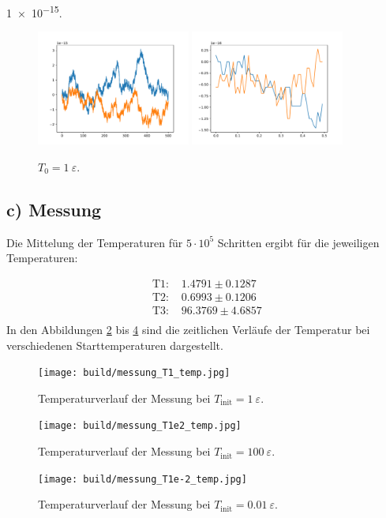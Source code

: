 \num{1e-15}.
\begin{figure}
    \centering
    \includegraphics[width=0.45\textwidth]{A1/build/aequi1_V.pdf}
    \includegraphics[width=0.45\textwidth]{A1/build/aequi1_VV.pdf}
    \caption{$T_\text{0} = 1\:\varepsilon$.}
    \label{fig:v1}
\end{figure} 

\FloatBarrier
\subsection*{c) Messung}
Die Mittelung der Temperaturen für $5\cdot 10^5$ Schritten ergibt für die jeweiligen Temperaturen:

\begin{align}
    \text{ T1:  } &  1.4791  \pm  0.1287 \\
    \text{ T2:  } &  0.6993  \pm  0.1206 \\
    \text{ T3:  } & 96.3769  \pm  4.6857 \\
\end{align}
In den Abbildungen \ref{fig:messung_T=1_temp} bis \ref{fig:messung_T=1e-2_temp}
sind die zeitlichen Verläufe der Temperatur
bei verschiedenen Starttemperaturen dargestellt.

\begin{figure}
    \centering
    \texttt{[image: build/messung\_T1\_temp.jpg]}
    \caption{Temperaturverlauf der Messung bei $T_\text{init} = 1\:\varepsilon$.}
    \label{fig:messung_T=1_temp}
\end{figure}
\begin{figure}
    \centering
    \texttt{[image: build/messung\_T1e2\_temp.jpg]}
    \caption{Temperaturverlauf der Messung bei $T_\text{init} = 100\:\varepsilon$.}
    \label{fig:messung_T=1e2_temp}
\end{figure}
\begin{figure}
    \centering
    \texttt{[image: build/messung\_T1e-2\_temp.jpg]}
    \caption{Temperaturverlauf der Messung bei $T_\text{init} = 0.01\:\varepsilon$.}
    \label{fig:messung_T=1e-2_temp}
\end{figure}


